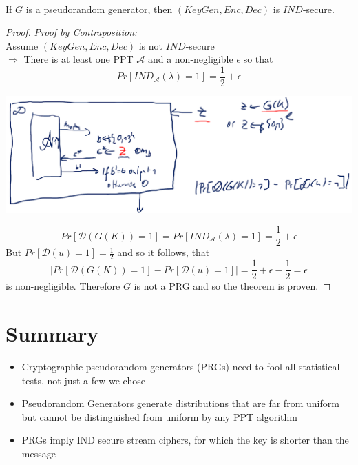 	
	\begin{theorem}\ \\
	    If $G$ is a pseudorandom generator, then $(KeyGen,Enc,Dec)$ is $IND$-secure.
	\end{theorem}
	\begin{proof}
		\textit{Proof by Contraposition:}\\
		Assume $(KeyGen,Enc,Dec)$ is not $IND$-secure\\
		$\Rightarrow$ There is at least one PPT $\mathcal{A}$ and a non-negligible $\epsilon$ so that
		$$Pr[IND_{\mathcal{A}}(\lambda) = 1] = \frac{1}{2} + \epsilon$$
		\begin{center}
			\includegraphics[width=160mm]{Graphics/Stream Ciphers/thm4_1.png}\newline
		\end{center}
		$$Pr[\mathcal{D}(G(K)) = 1] = Pr[IND_{\mathcal{A}}(\lambda) = 1] = \frac{1}{2} + \epsilon$$
		But $Pr[\mathcal{D}(u) = 1] = \frac{1}{2}$ and so it follows, that\\
		$$|Pr[\mathcal{D}(G(K)) = 1] - Pr[\mathcal{D}(u) = 1]| = \frac{1}{2} + \epsilon - \frac{1}{2} = \epsilon$$
		is non-negligible. Therefore $G$ is not a PRG and so the theorem is proven.
	\end{proof}
	
\section{Summary}
	\begin{itemize}
		\item Cryptographic pseudorandom generators (PRGs) need to fool all statistical tests, not just a few we chose
		\item Pseudorandom Generators generate distributions that are far from uniform but cannot be distinguished from uniform by any PPT algorithm
		\item PRGs imply IND secure stream ciphers, for which the key is shorter than the message
	\end{itemize}

	



































